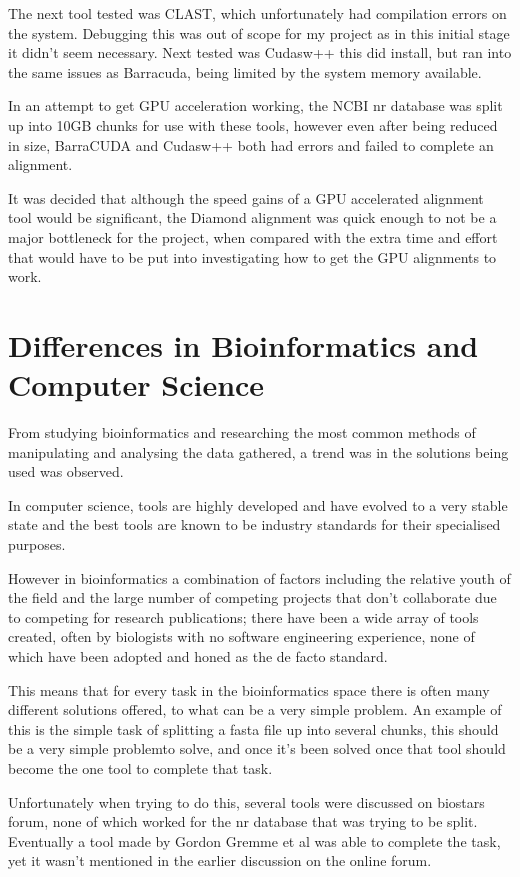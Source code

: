 The next tool tested was CLAST\cite{clast}, which unfortunately had compilation errors on the system. Debugging this was out of scope for my project as in this initial stage it didn't seem necessary. Next tested was Cudasw++\cite{cudasw} this did install, but ran into the same issues as Barracuda, being limited by the system memory available. 

In an attempt to get GPU acceleration working, the NCBI nr database was split up into 10GB chunks for use with these tools, however even after being reduced in size, BarraCUDA and Cudasw++ both had errors and failed to complete an alignment. 

It was decided that although the speed gains of a GPU accelerated alignment tool would be significant, the Diamond alignment was quick enough to not be a major bottleneck for the project, when compared with the extra time and effort that would have to be put into investigating how to get the GPU alignments to work. 

\section{Differences in Bioinformatics and Computer Science}
From studying bioinformatics and researching the most common methods of manipulating and analysing the data gathered, a trend was in the solutions being used was observed. 

In computer science, tools are highly developed and have evolved to a very stable state and the best tools are known to be industry standards for their specialised purposes. 

However in bioinformatics a combination of factors including the relative youth of the field and the large number of competing projects that don't collaborate due to competing for research publications; there have been a wide array of tools created, often by biologists with no software engineering experience, none of which have been adopted and honed as the de facto standard. 

This means that for every task in the bioinformatics space there is often many different solutions offered, to what can be a very simple problem. An example of this is the simple task of splitting a fasta file up into several chunks, this should be a very simple problemto solve, and once it's been solved once that tool should become the one tool to complete that task. 

Unfortunately when trying to do this, several tools were discussed on biostars forum\cite{biostars}, none of which worked for the nr database that was trying to be split. Eventually a tool made by Gordon Gremme et al\cite{genometools} was able to complete the task, yet it wasn't mentioned in the earlier discussion on the online forum. 

